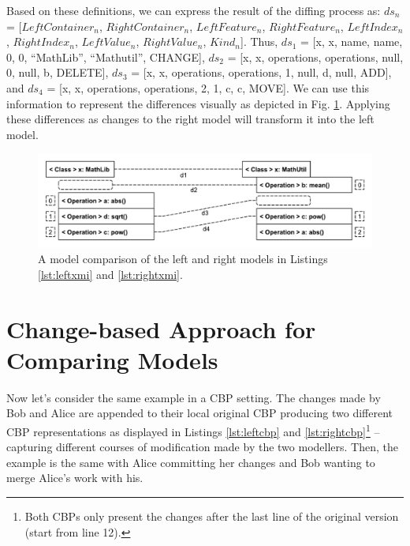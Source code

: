 \documentclass{jot}
\begin{document}
    Based on these definitions, we can express the result of the diffing process as: $ds_{n}$ = [$LeftContainer_n$, $RightContainer_n$, $LeftFeature_n$, $RightFeature_n$, $LeftIndex_n$, $RightIndex_n$, $LeftValue_n$, $RightValue_n$, $Kind_n$]. Thus, $ds_{1}$ =  [\textsf{x}, \textsf{x}, \textsf{name}, \textsf{name}, 0, 0, ``MathLib'', ``Mathutil'', \textsf{CHANGE}], $ds_{2}$ = [\textsf{x}, \textsf{x}, \textsf{operations}, \textsf{operations}, null, 0, null, \textsf{b}, \textsf{DELETE}], $ds_{3}$ = [\textsf{x}, \textsf{x}, \textsf{operations}, \textsf{operations}, 1, null, \textsf{d}, null, \textsf{ADD}], and $ds_{4}$ = [\textsf{x}, \textsf{x}, \textsf{operations}, \textsf{operations}, 2, 1, \textsf{c}, \textsf{c}, \textsf{MOVE}]. We can use this information to represent the differences visually as depicted in Fig. \ref{fig:xmi_comparison}. Applying these differences as changes to the right model will transform it into the left model.  
    
    \begin{figure}
        \includegraphics[width=\linewidth]{XmiComparison}
        \caption{A model comparison of the left and right models in Listings \ref{lst:leftxmi} and \ref{lst:rightxmi}.}
        \label{fig:xmi_comparison}
    \end{figure}
    
    \section{Change-based Approach for Comparing Models}
    \label{sec:change_based_approach_for_comparing_models}
    
    Now let's consider the same example in a CBP setting.
    The changes made by Bob and Alice are appended to their local original CBP producing two different CBP representations as displayed in Listings \ref{lst:leftcbp} and \ref{lst:rightcbp}\footnote{Both CBPs only present the changes after the last line of the original version (start from line 12).} -- capturing different courses of modification made by the two modellers.
    Then, the example is the same with Alice committing her changes and Bob wanting to merge Alice's work with his. 
    
\end{document}
